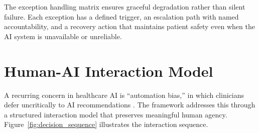 The exception handling matrix ensures graceful degradation rather than silent failure. Each exception has a defined trigger, an escalation path with named accountability, and a recovery action that maintains patient safety even when the AI system is unavailable or unreliable.

\section{Human-AI Interaction Model}
\label{sec:fw_human_ai}

A recurring concern in healthcare AI is ``automation bias,'' in which clinicians defer uncritically to AI recommendations \citep{rajkomar2019healthcare}. The framework addresses this through a structured interaction model that preserves meaningful human agency. Figure~\ref{fig:decision_sequence} illustrates the interaction sequence.

